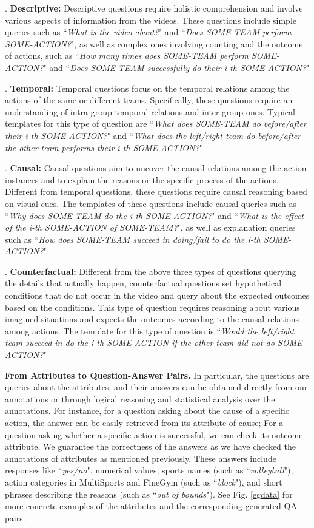 . \textbf{Descriptive:} Descriptive questions require holistic comprehension and involve various aspects of information from the videos. These questions include simple queries such as ``\textit{What is the video about?}" and ``\textit{Does SOME-TEAM perform SOME-ACTION?}", as well as complex ones involving counting and the outcome of actions, such as ``\textit{How many times does SOME-TEAM perform SOME-ACTION?}" and ``\textit{Does SOME-TEAM successfully do their i-th SOME-ACTION?}"

. \textbf{Temporal:} Temporal questions focus on the temporal relations among the actions of the same or different teams. Specifically, these questions require an understanding of intra-group temporal relations and inter-group ones. Typical templates for this type of question are ``\textit{What does SOME-TEAM do before/after their i-th SOME-ACTION?}" and ``\textit{What does the left/right team do before/after the other team performs their i-th SOME-ACTION?}"

. \textbf{Causal:} Causal questions aim to uncover the causal relations among the action instances and to explain the reasons or the specific process of the actions. Different from temporal questions, these questions require causal reasoning based on visual cues. The templates of these questions include causal queries such as ``\textit{Why does SOME-TEAM do the i-th SOME-ACTION?}" and ``\textit{What is the effect of the i-th SOME-ACTION of SOME-TEAM?}", as well as explanation queries such as ``\textit{How does SOME-TEAM succeed in doing/fail to do the i-th SOME-ACTION?}"

. \textbf{Counterfactual:} Different from the above three types of questions querying the details that actually happen, counterfactual questions set hypothetical conditions that do not occur in the video and query about the expected outcomes based on the conditions. This type of question requires reasoning about various imagined situations and expects the outcomes according to the causal relations among actions. The template for this type of question is ``\textit{Would the left/right team succeed in do the i-th SOME-ACTION if the other team did not do SOME-ACTION?}"

\noindent\textbf{From Attributes to Question-Answer Pairs.} In particular, the questions are queries about the attributes, and their answers can be obtained directly from our annotations or through logical reasoning and statistical analysis over the annotations. For instance, for a question asking about the cause of a specific action, the answer can be easily retrieved from its attribute of cause; For a question asking whether a specific action is successful, we can check its outcome attribute. We guarantee the correctness of the answers as we have checked the annotations of attributes as mentioned previously.
These answers include responses like ``\textit{yes/no}", numerical values, sports names (such as ``\textit{volleyball}"), action categories in MultiSports and FineGym (such as ``\textit{block}"), and short phrases describing the reasons (such as ``\textit{out of bounds}"). See Fig. \ref{egdata} for more concrete examples of the attributes and the corresponding generated QA pairs. 

